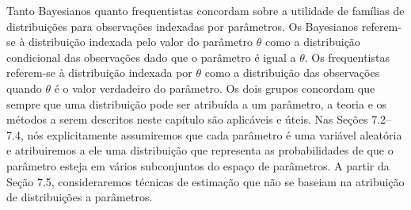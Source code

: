 \vspace{0.5cm}
Tanto Bayesianos quanto frequentistas concordam sobre a utilidade de famílias de distribuições para observações indexadas por parâmetros. Os Bayesianos referem-se à distribuição indexada pelo valor do parâmetro $\theta$ como a distribuição condicional das observações dado que o parâmetro é igual a $\theta$. Os frequentistas referem-se à distribuição indexada por $\theta$ como a distribuição das observações quando $\theta$ é o valor verdadeiro do parâmetro. Os dois grupos concordam que sempre que uma distribuição pode ser atribuída a um parâmetro, a teoria e os métodos a serem descritos neste capítulo são aplicáveis e úteis. Nas Seções 7.2–7.4, nós explicitamente assumiremos que cada parâmetro é uma variável aleatória e atribuiremos a ele uma distribuição que representa as probabilidades de que o parâmetro esteja em vários subconjuntos do espaço de parâmetros. A partir da Seção 7.5, consideraremos técnicas de estimação que não se baseiam na atribuição de distribuições a parâmetros.
